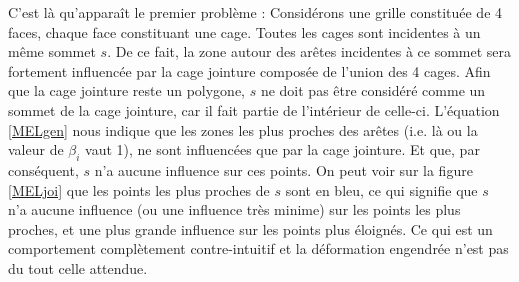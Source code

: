 C'est là qu'apparaît le premier problème : Considérons une grille
constituée de 4 faces, chaque face constituant une cage. Toutes les
cages sont incidentes à un même sommet $s$. De ce fait, la zone autour
des arêtes incidentes à ce sommet sera fortement influencée par la
cage jointure composée de l'union des 4 cages. Afin que la cage
jointure reste un polygone, $s$ ne doit pas être considéré comme un
sommet de la cage jointure, car il fait partie de l'intérieur de
celle-ci. L'équation \ref{MELgen} nous indique que les zones les plus
proches des arêtes (i.e. là ou la valeur de $\beta_i$ vaut 1), ne sont
influencées que par la cage jointure. Et que, par conséquent, $s$ n'a
aucune influence sur ces points. On peut voir sur la figure
\ref{MELjoi} que les points les plus proches de $s$ sont en bleu, ce
qui signifie que $s$ n'a aucune influence (ou une influence très
minime) sur les points les plus proches, et une plus grande influence
sur les points plus éloignés. Ce qui est un comportement complètement
contre-intuitif et la déformation engendrée n'est pas du tout celle
attendue.

